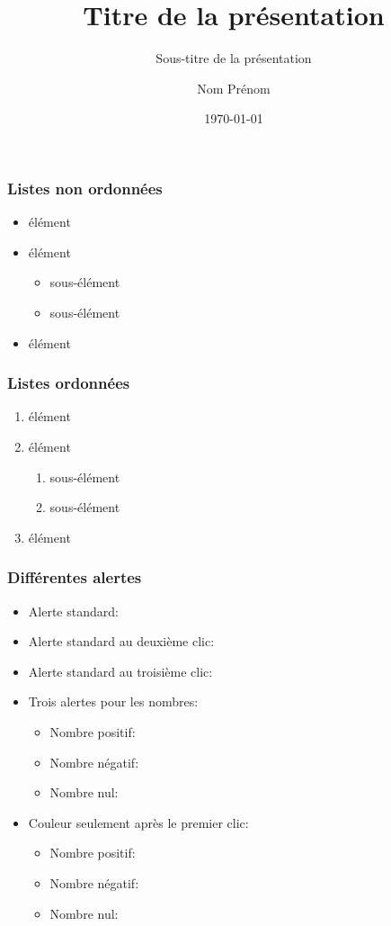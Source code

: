 \documentclass[
    9pt, aspectratio = 169,
    xcolor = {dvipsnames},
    hyperref = {pdftex, pdfpagemode=UseNone, hidelinks, pdfdisplaydoctitle=true},
    usepdftitle = false
]{beamer}
\title{Titre de la présentation} %
\subtitle{Sous-titre de la présentation} %
\author{Nom Prénom} %
\date{\today} %
\begin{document}
\titleframe

\begin{frame}
    \frametitle{Listes non ordonnées}
    \begin{itemize}
        \item élément
        \item élément
        \begin{itemize}
            \item sous-élément
            \item sous-élément
        \end{itemize}
        \item élément
    \end{itemize}
\end{frame}

\begin{frame}
    \frametitle{Listes ordonnées}
    \begin{enumerate}
        \item élément
        \item élément
        \begin{enumerate}
            \item sous-élément
            \item sous-élément
        \end{enumerate}
        \item élément
    \end{enumerate}
\end{frame}


\begin{frame}
    \frametitle{Différentes alertes}
    \begin{itemize}
        \item Alerte standard: 
        \item Alerte standard au deuxième clic: 
        \item Alerte standard au troisième clic: 
        \item Trois alertes pour les nombres:
              \begin{itemize}
                  \item Nombre positif: 
                  \item Nombre négatif: 
                  \item Nombre nul: 
              \end{itemize}
        \item Couleur seulement après le premier clic:
              \begin{itemize}
                  \item Nombre positif: 
                  \item Nombre négatif: 
                  \item Nombre nul: 
              \end{itemize}
    \end{itemize}
\end{frame}

\end{document}
